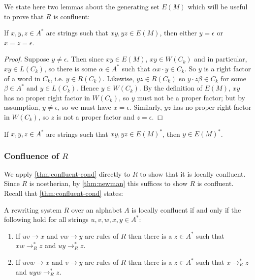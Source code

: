 \documentclass[showlabels,noindex,12pt]{lmaths}
\begin{document}
We state here two lemmas about the generating set $E(M)$ which will be useful to prove that $R$ is confluent:

\begin{lemma} \label{lma:no-middle-E(M)}
	If $x, y, z \in A^*$ are strings such that $xy, yz \in E(M)$, then either $y = \epsilon$ or $x = z = \epsilon$.
\end{lemma}
\begin{proof}
	Suppose $y \ne \epsilon$. Then since $xy \in E(M)$, $xy \in W(C_k)$ and in particular, $xy \in L(C_k)$, so there is some $\alpha \in A^*$ such that $\alpha x \cdot y \in C_k$. So $y$ is a right factor of a word in $C_k$, i.e. $y \in R(C_k)$. Likewise, $yz \in R(C_k)$ so $y \cdot z\beta \in C_k$ for some $\beta \in A^*$ and $y \in L(C_k)$. Hence $y \in W(C_k)$. By the definition of $E(M)$, $xy$ has no proper right factor in $W(C_k)$, so $y$ must not be a proper factor; but by assumption, $y \ne \epsilon$, so we must have $x = \epsilon$. Similarly, $yz$ has no proper right factor in $W(C_k)$, so $z$ is not a proper factor and $z = \epsilon$.
\end{proof}

\begin{cly} \label{cly:middle-E(M)*}
	If $x, y, z \in A^*$ are strings such that $xy, yz \in E(M)^*$, then $y \in E(M)^*$.
\end{cly}


\subsubsection{\texorpdfstring{Confluence of $R$}{Confluence of R}}

We apply \cref{thm:confluent-cond} directly to $R$ to show that it is locally confluent. Since $R$ is noetherian, by \cref{thm:newman} this suffices to show $R$ is confluent. Recall that \cref{thm:confluent-cond} states:

\begin{theorem*}
	A rewriting system $R$ over an alphabet $A$ is locally confluent if and only if the following hold for all strings $u, v, w, x, y \in A^*$:
	\begin{enumerate}[(1)]
		\item \label{it:conf-overlap} If $uv \to x$ and $vw \to y$ are rules of $R$ then there is a $z \in A^*$ such that $xw \to^*_R z$ and $uy \to^*_R z$.
		\item \label{it:conf-middle} If $uvw \to x$ and $v \to y$ are rules of $R$ then there is a $z \in A^*$ such that $x \to^*_R z$ and $uyw \to^*_R z$.
	\end{enumerate}
\end{theorem*}
\end{document}
